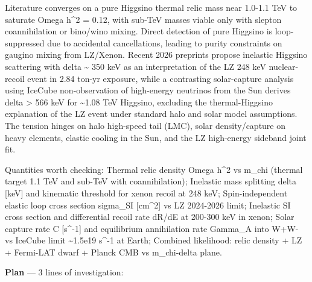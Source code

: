 \documentclass[11pt,a4paper]{article}
\begin{document}
Literature converges on a pure Higgsino thermal relic mass near 1.0-1.1 TeV to saturate Omega h\textasciicircum{}2 = 0.12, with sub-TeV masses viable only with slepton coannihilation or bino/wino mixing. Direct detection of pure Higgsino is loop-suppressed due to accidental cancellations, leading to purity constraints on gaugino mixing from LZ/Xenon. Recent 2026 preprints propose inelastic Higgsino scattering with delta \textasciitilde{} 350 keV as an interpretation of the LZ 248 keV nuclear-recoil event in 2.84 ton-yr exposure, while a contrasting solar-capture analysis using IceCube non-observation of high-energy neutrinos from the Sun derives delta \textgreater{} 566 keV for \textasciitilde{}1.08 TeV Higgsino, excluding the thermal-Higgsino explanation of the LZ event under standard halo and solar model assumptions. The tension hinges on halo high-speed tail (LMC), solar density/capture on heavy elements, elastic cooling in the Sun, and the LZ high-energy sideband joint fit.

Quantities worth checking: Thermal relic density Omega h\textasciicircum{}2 vs m\_chi (thermal target 1.1 TeV and sub-TeV with coannihilation); Inelastic mass splitting delta [keV] and kinematic threshold for xenon recoil at 248 keV; Spin-independent elastic loop cross section sigma\_SI [cm\textasciicircum{}2] vs LZ 2024-2026 limit; Inelastic SI cross section and differential recoil rate dR/dE at 200-300 keV in xenon; Solar capture rate C [s\textasciicircum{}-1] and equilibrium annihilation rate Gamma\_A into W+W- vs IceCube limit \textasciitilde{}1.5e19 s\textasciicircum{}-1 at Earth; Combined likelihood: relic density + LZ + Fermi-LAT dwarf + Planck CMB vs m\_chi-delta plane.

\textbf{Plan} --- 3 lines of investigation:
\end{document}
